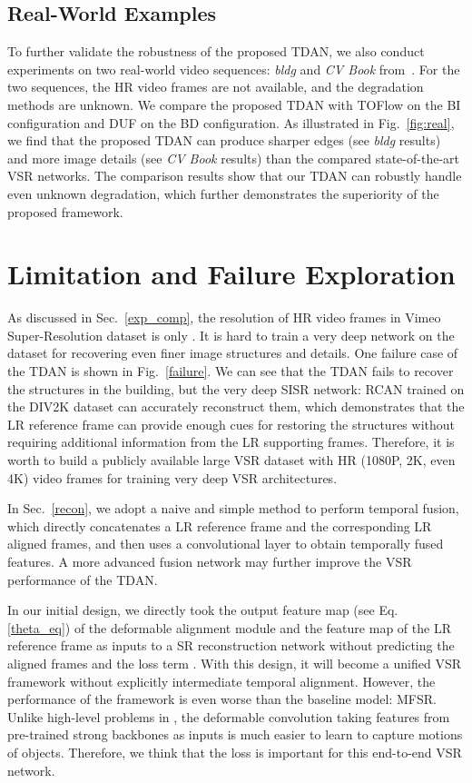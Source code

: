 \documentclass[10pt,twocolumn,letterpaper]{article}
\begin{document}
\subsection{Real-World Examples}
\label{real}
To further validate the robustness of the proposed TDAN, we also conduct experiments on two real-world video sequences: \textit{bldg} and \textit{CV Book} from~\cite{Liao_2015_ICCV}. For the two sequences, the HR video frames are not available, and the degradation methods are unknown. We compare the proposed TDAN with TOFlow on the BI configuration and DUF on the BD configuration. As illustrated in Fig.~\ref{fig:real}, we find that the proposed TDAN can produce sharper edges (see \textit{bldg} results) and more image details (see \textit{CV Book} results) than the compared state-of-the-art VSR networks. The comparison results show that our TDAN can robustly handle even unknown degradation, which further demonstrates the superiority of the proposed framework.


\section{Limitation and Failure Exploration}
\label{lim_fail}

As discussed in Sec.~\ref{exp_comp}, the resolution of HR video frames in Vimeo Super-Resolution dataset is only . It is hard to train a very deep network on the dataset for recovering even finer image structures and details. One failure case of the TDAN is shown in Fig.~\ref{failure}. We can see that the TDAN fails to recover the structures in the building, but the very deep SISR network: RCAN trained on the DIV2K dataset can accurately reconstruct them, which demonstrates that the LR reference frame can provide enough cues for restoring the structures without requiring additional information from the LR supporting frames. Therefore, it is worth to build a publicly available large VSR dataset with HR (\eg 1080P, 2K, even 4K) video frames for training very deep VSR architectures.

In Sec.~\ref{recon}, we adopt a naive and simple method to perform temporal fusion, which directly concatenates a LR reference frame and the corresponding LR aligned frames, and then uses a convolutional layer to obtain temporally fused features. A more advanced fusion network may further improve the VSR performance of the TDAN.

In our initial design, we directly took the output feature map  (see Eq. \ref{theta_eq}) of the deformable alignment module and the feature map  of the LR reference frame as inputs to a SR reconstruction network without predicting the aligned frames and the loss term . With this design, it will become a unified VSR framework without explicitly intermediate temporal alignment. However, the performance of the framework is even worse than the baseline model: MFSR. Unlike high-level problems in \cite{Dai_2017_ICCV,Bertasius_2018_ECCV}, the deformable convolution taking features from pre-trained strong backbones as inputs is much easier to learn to capture motions of objects. Therefore, we think that the loss  is important for this end-to-end VSR network.
\end{document}
